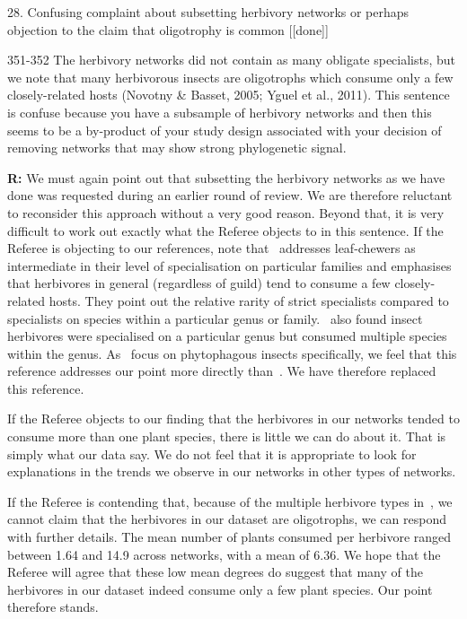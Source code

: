 \documentclass[12pt]{letter}
\newenvironment{refquote}{\bigskip \begin{it}}{\end{it}\smallskip}
\begin{document}
	28. Confusing complaint about subsetting herbivory networks or perhaps objection to the claim that oligotrophy is common [[done]]

		\begin{refquote}
			351-352 The herbivory networks did not contain as many obligate specialists, but we note that many herbivorous insects are oligotrophs which consume only a few closely-related hosts (Novotny & Basset, 2005; Yguel et al., 2011). This sentence is confuse because you have a subsample of herbivory networks and then this seems to be a by-product of your study design associated with your decision of removing networks that may show strong phylogenetic signal.
		\end{refquote}


		\textbf{R:} We must again point out that subsetting the herbivory networks as we have done was requested during an earlier round of review. We are therefore reluctant to reconsider this approach without a very good reason. Beyond that, it is very difficult to work out exactly what the Referee objects to in this sentence. If the Referee is objecting to our references, note that~\citet{Novotny2005} addresses leaf-chewers as intermediate in their level of specialisation on particular families and emphasises that herbivores in general (regardless of guild) tend to consume a few closely-related hosts. They point out the relative rarity of strict specialists compared to specialists on species within a particular genus or family.~\citet{Brandle2006} also found insect herbivores were specialised on a particular genus but consumed multiple species within the genus. As~\citet{Brandle2006} focus on phytophagous insects specifically, we feel that this reference addresses our point more directly than~\citet{Yguel2011}. We have therefore replaced this reference.


		If the Referee objects to our finding that the herbivores in our networks tended to consume more than one plant species, there is little we can do about it. That is simply what our data say. We do not feel that it is appropriate to look for explanations in the trends we observe in our networks in other types of networks. 


		If the Referee is contending that, because of the multiple herbivore types in~\citet{Novotny2005}, we cannot claim that the herbivores in our dataset are oligotrophs, we can respond with further details. The mean number of plants consumed per herbivore ranged between 1.64 and 14.9 across networks, with a mean of 6.36. We hope that the Referee will agree that these low mean degrees do suggest that many of the herbivores in our dataset indeed consume only a few plant species. Our point therefore stands.
\end{document}
